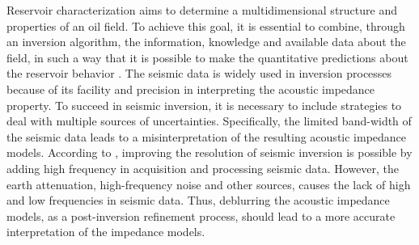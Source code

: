 \documentclass[conference,compsoc]{IEEEtran}
\begin{document}
Reservoir characterization aims to determine a multidimensional
structure and properties of an oil field. To achieve this goal, it is essential to combine, through an
inversion algorithm, the information, knowledge and available data about the field,
in such a way that it is possible to make the
quantitative predictions about the reservoir behavior \cite{buiting}.
The seismic data is widely used in inversion processes because of its facility and precision
in interpreting the acoustic impedance property.
To succeed in seismic inversion, it is necessary to include strategies to deal with multiple
sources of uncertainties. Specifically, the limited band-width of the seismic data leads to
a misinterpretation of the resulting acoustic impedance models.
According to \cite{xiaoiu}, improving the resolution of seismic inversion is
possible by adding high frequency in acquisition and processing seismic data.
However, the earth attenuation, high-frequency noise and other sources, causes 
the lack of high and low frequencies \cite{xiaoiu} in seismic data. 
Thus, deblurring the acoustic impedance models, as a post-inversion refinement process, should lead to a more accurate
interpretation of the impedance models.






\end{document}
